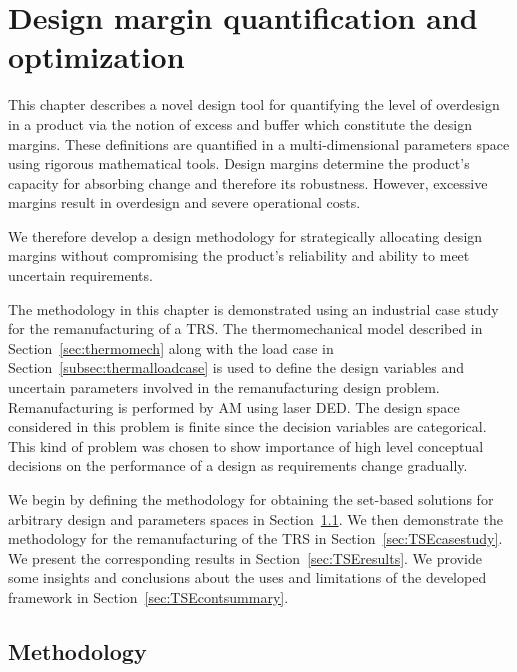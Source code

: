 \chapter{Design margin quantification and optimization}
\label{ch:TSEcont}

This chapter describes a novel design tool for quantifying the level of overdesign in a product via the notion of excess and buffer which constitute the design margins. These definitions are quantified in a multi-dimensional parameters space using rigorous mathematical tools. Design margins determine the product's capacity for absorbing change and therefore its robustness. However, excessive margins result in overdesign and severe operational costs.

We therefore develop a design methodology for strategically allocating design margins without compromising the product's reliability and ability to meet uncertain requirements.

The methodology in this chapter is demonstrated using an industrial case study for the remanufacturing of a \ac{TRS}. The thermomechanical model described in Section~\ref{sec:thermomech} along with the load case in Section~\ref{subsec:thermalloadcase} is used to define the design variables and uncertain parameters involved in the remanufacturing design problem. Remanufacturing is performed by \ac{AM} using laser \ac{DED}. The design space considered in this problem is finite since the decision variables are categorical. This kind of problem was chosen to show importance of high level conceptual decisions on the performance of a design as requirements change gradually.

We begin by defining the methodology for obtaining the set-based solutions for arbitrary design and parameters spaces in Section~\ref{sec:TSEmethods}. We then demonstrate the methodology for the remanufacturing of the \ac{TRS} in Section~\ref{sec:TSEcasestudy}. We present the corresponding results in Section~\ref{sec:TSEresults}. We provide some insights and conclusions about the uses and limitations of the developed framework in Section~\ref{sec:TSEcontsummary}.

\section{Methodology} \label{sec:TSEmethods}

